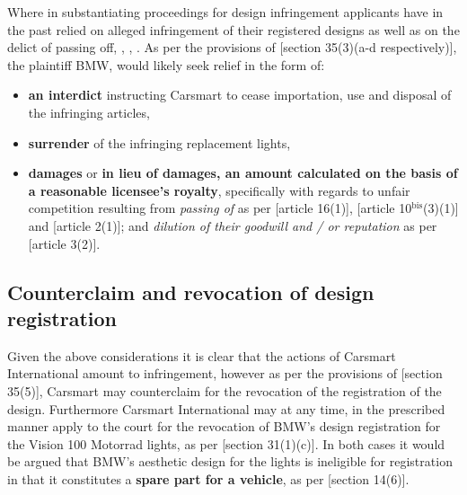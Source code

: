 \documentclass[11pt]{article}
\begin{document}
Where in substantiating proceedings for design infringement applicants have in
the past relied on alleged infringement of their registered designs as well as
on the delict of passing off, 
\cite{corbett84_homecraft_steel_v_sm_hare},
 \cite{vdwesthuizen02_slavepak_v_buddy},
\cite{duplessis02_koninklijke_phillips_v_kenwood}. As per the provisions of
[section 35(3)(a-d respectively)]\cite{rsa93_designs_act}, the plaintiff BMW,
would likely seek relief in the form of:
\begin{itemize}
\item \textbf{an interdict} instructing Carsmart to cease importation, use and disposal of
the infringing articles,
\item \textbf{surrender} of the infringing replacement lights,
\item \textbf{damages} or \textbf{in lieu of damages, an amount calculated on the basis of a
reasonable licensee's royalty}, specifically with regards to unfair
competition resulting from \emph{passing of} as per [article 16(1)]\cite{wto17_trips}, [article
10\(^{\text{bis}}\)(3)(1)]\cite{wipo83_paris_conve_protect_ip} and [article
2(1)]\cite{wipo96_model_provi_unfair_comp};
and \emph{dilution of their goodwill and / or reputation} as per [article
3(2)]\cite{wipo96_model_provi_unfair_comp}.
\end{itemize}

\subsection{Counterclaim and revocation of design registration}
\label{sec:org58f26a5}

Given the above considerations it is clear that the actions of Carsmart
International amount to infringement, however as per the provisions of [section
35(5)]\cite{rsa93_designs_act}, Carsmart may counterclaim for the revocation of
the registration of the design. Furthermore Carsmart International may at any
time, in the prescribed manner apply to the court for the revocation of BMW's
design registration for the Vision 100 Motorrad lights, as per [section
31(1)(c)]\cite{rsa93_designs_act}. In both cases it would be argued that BMW's
aesthetic design for the lights is ineligible for registration in that it
constitutes a \textbf{spare part for a vehicle}, as per [section
14(6)]\cite{rsa93_designs_act}.\\
\end{document}
